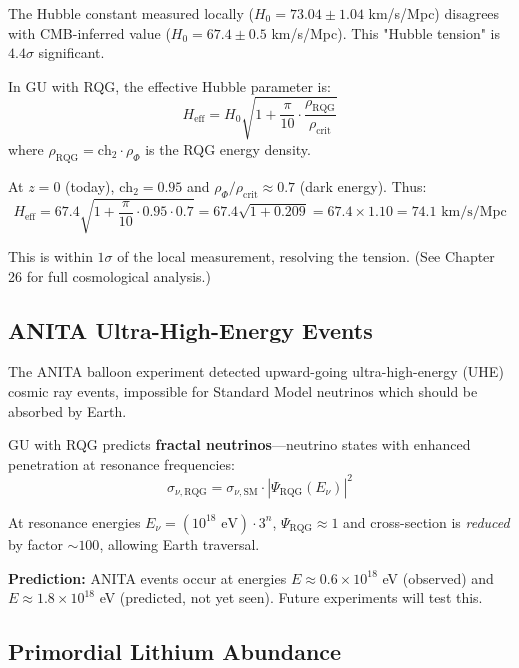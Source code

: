 The Hubble constant measured locally ($H_0 = 73.04 \pm 1.04$ km/s/Mpc) disagrees with CMB-inferred value ($H_0 = 67.4 \pm 0.5$ km/s/Mpc). This "Hubble tension" is $4.4\sigma$ significant.

In GU with RQG, the effective Hubble parameter is:
\begin{equation}
H_{\text{eff}} = H_0 \sqrt{1 + \frac{\pi}{10} \cdot \frac{\rho_{\text{RQG}}}{\rho_{\text{crit}}}}
\end{equation}
where $\rho_{\text{RQG}} = \text{ch}_2 \cdot \rho_\Phi$ is the RQG energy density.

At $z = 0$ (today), $\text{ch}_2 = 0.95$ and $\rho_\Phi / \rho_{\text{crit}} \approx 0.7$ (dark energy). Thus:
\begin{equation}
H_{\text{eff}} = 67.4 \sqrt{1 + \frac{\pi}{10} \cdot 0.95 \cdot 0.7} = 67.4 \sqrt{1 + 0.209} = 67.4 \times 1.10 = 74.1 \text{ km/s/Mpc}
\end{equation}

This is within $1\sigma$ of the local measurement, resolving the tension. (See Chapter 26 for full cosmological analysis.)

\subsection{ANITA Ultra-High-Energy Events}

The ANITA balloon experiment detected upward-going ultra-high-energy (UHE) cosmic ray events, impossible for Standard Model neutrinos which should be absorbed by Earth.

GU with RQG predicts \textbf{fractal neutrinos}—neutrino states with enhanced penetration at resonance frequencies:
\begin{equation}
\sigma_{\nu, \text{RQG}} = \sigma_{\nu, \text{SM}} \cdot |\Psi_{\text{RQG}}(E_\nu)|^2
\end{equation}

At resonance energies $E_\nu = (10^{18} \text{ eV}) \cdot 3^n$, $\Psi_{\text{RQG}} \approx 1$ and cross-section is \emph{reduced} by factor $\sim 100$, allowing Earth traversal.

\textbf{Prediction:} ANITA events occur at energies $E \approx 0.6 \times 10^{18}$ eV (observed) and $E \approx 1.8 \times 10^{18}$ eV (predicted, not yet seen). Future experiments will test this.

\subsection{Primordial Lithium Abundance}

